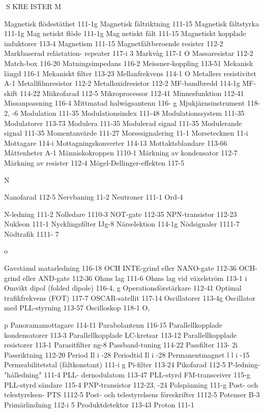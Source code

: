 \documentclass[a4paper,twoside,twocolumn,openright]{book}
\begin{document}
{{{{{{{{{{{S KRE ISTER
M

Magnetisk flödestäthet 111-1g
Magnetisk fältriktning 111-15
Magnetisk fältstyrka 111-1g
Mag netiskt flöde 111-1g
Mag netiskt fält 111-15
Magnetiskt kopplade induktorer 113-4
Magnetism 111-15
Magnetfältberoende resister 112-2
Markbaserad relästation- repeater 117-i 3
Markvåg 117-1 O
Massaresistar 112-2
Match-box 116-20
Matningsimpedans 116-2
Meissner-koppling 113-51
Mekanisk längd 116-1
Mekaniskt filter 113-23
Mellanfrekvens 114-1 O
Metallers resistivitet A-1
Metallfilmresistor 112-2
Metalloxidresistor 112-2
MF-bandbredd 114-1g
MF-skift 114-22
Miikrofarad 112-5
Mikroprocessor 112-41
Minnesfunktion 112-41
Missanpassning 116-4
Mittmatad halwågsantenn 116- g
Mjukjärnsinstrument 118-2, -6
Modulation 111-35
Modulationsindex 111-48
Modulationssystem 111-35
Modulatorer 113-73
Modulera 111-35
Modulerad signal 111-35
Modulerande signal 111-35
Momentanvärde 111-27
Morsesignalering 11-1
Morsetecknen 11-i
Mottagare 114-i
Mottagningskonverter 114-13
Mottaktsblandare 113-66
Måttenheter A-1
Människokroppen 1110-1
Märkning av kondensator 112-7
Märkning av resister 112-4
Mögel-Dellinger-effekten 117-5

N

Nanofarad 112-5
Nervbaning 11-2
Neutroner 111-1
Ord-4

N-ledning 111-2
Nolledare 1110-3
NOT-gate 112-35
NPN-transistor 112-23
Nukleon 111-1
Nycklingsfilter IJg-8
Närselektion 114-1g
Nödsignaler 1111-7
Nödtrafik 1111- 7

o

Gavstämd matarledning 116-18
OCH INTE-grind eller NANO-gate 112-36
OCH-grind eller AND-gate 112-36
Ohms lag 111-6
Ohms lag vid växelström 113-1 i
Omvikt dipol (folded dipole) 116-4, g
Operationsförstärkare 112-41
Optimal trafikfrekvens (FOT) 117-7
OSCAR-satellit 117-14
Oscillatorer 113-4g
Oscillator med PLL-styrning 113-57
Oscilloskop 118-1 O,

p
Panoramamottagare 114-11
Parabolantenn 116-15
Parallellkopplade kondensatorer 113-3
Parallellkopplade LC-kretsar 113-12
Parallellkopplade resistorer 113-1
Parasitfilter ng-8
Passband-tuning 114-22
Passfilter 113- 2i
Passriktning 112-20
Period Il i -28
Periodtid Il i -28
Permanentmagnet l l i -15
Permeabilitetstal (fältkonstant) 111-i g
Pi-filter 113-24
Pikofarad 112-5
P-ledning- "hålledning" 111-4
PLL- dernodulatom 113-47
PLL-styrd FM-transceiver 115-g
PLL-styrd sändare 115-4
PNP-transistor 112-23, -24
Polspänning 111-g
Post- och telestyrelsen- PTS 1112-5
Post- och telestyrelsens föreskrifter 1112-5
Potenser B-3
Primärlindning 112-i 5
Produktdetektor 113-43
Proton 111-1

}}}}}}}}}}}
\end{document}
